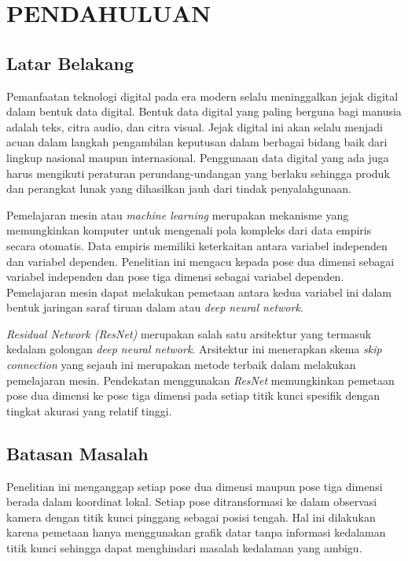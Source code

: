 
\chapter{PENDAHULUAN}
\label{cha:1-Pendahuluan}

\section{Latar Belakang}
\label{sec:1-LatarBelakang}

Pemanfaatan teknologi digital pada era modern selalu meninggalkan jejak digital dalam bentuk data 
digital. Bentuk data digital yang paling berguna bagi manusia adalah teks, citra audio, dan citra 
visual. Jejak digital ini akan selalu menjadi acuan dalam langkah pengambilan keputusan dalam 
berbagai bidang baik dari lingkup nasional maupun internasional. Penggunaan data digital yang ada 
juga harus mengikuti peraturan perundang-undangan yang berlaku sehingga produk dan perangkat lunak 
yang dihasilkan jauh dari tindak penyalahgunaan.

Pemelajaran mesin atau \textit{machine learning} merupakan mekanisme yang memungkinkan komputer 
untuk mengenali pola kompleks dari data empiris secara otomatis. Data empiris memiliki keterkaitan 
antara variabel independen dan variabel dependen. Penelitian ini mengacu kepada pose dua dimensi 
sebagai variabel independen dan pose tiga dimensi sebagai variabel dependen. Pemelajaran mesin 
dapat melakukan pemetaan antara kedua variabel ini dalam bentuk jaringan saraf tiruan dalam atau 
\textit{deep neural network}.

\textit{Residual Network (ResNet)} merupakan salah satu arsitektur yang termasuk kedalam golongan 
\textit{deep neural network}. Arsitektur ini menerapkan skema \textit{skip connection} yang sejauh 
ini merupakan metode terbaik dalam melakukan pemelajaran mesin. Pendekatan menggunakan \textit{ResNet} 
memungkinkan pemetaan pose dua dimensi ke pose tiga dimensi pada setiap titik kunci spesifik dengan 
tingkat akurasi yang relatif tinggi.

\section{Batasan Masalah}
\label{sec:1-BatasMasalah}

Penelitian ini menganggap setiap pose dua dimensi maupun pose tiga dimensi berada dalam koordinat 
lokal. Setiap pose ditransformasi ke dalam observasi kamera dengan titik kunci pinggang 
sebagai posisi tengah. Hal ini dilakukan karena pemetaan hanya menggunakan grafik datar tanpa 
informasi kedalaman titik kunci sehingga dapat menghindari masalah kedalaman yang ambigu. 

